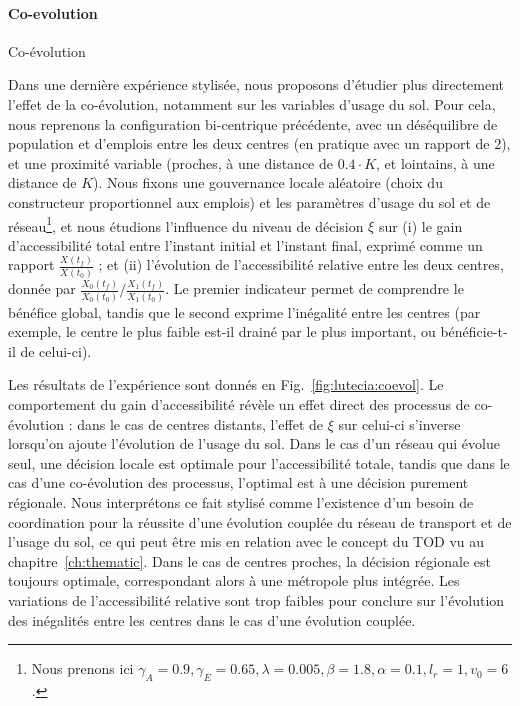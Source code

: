 \paragraph{Co-evolution}{Co-évolution}

Dans une dernière expérience stylisée, nous proposons d'étudier plus directement l'effet de la co-évolution, notamment sur les variables d'usage du sol. Pour cela, nous reprenons la configuration bi-centrique précédente, avec un déséquilibre de population et d'emplois entre les deux centres (en pratique avec un rapport de 2), et une proximité variable (proches, à une distance de $0.4\cdot K$, et lointains, à une distance de $K$). Nous fixons une gouvernance locale aléatoire (choix du constructeur proportionnel aux emplois) et les paramètres d'usage du sol et de réseau\footnote{Nous prenons ici $\gamma_A = 0.9, \gamma_E = 0.65, \lambda = 0.005, \beta = 1.8, \alpha = 0.1, l_r = 1, v_0 = 6$.}, et nous étudions l'influence du niveau de décision $\xi$ sur (i) le gain d'accessibilité total entre l'instant initial et l'instant final, exprimé comme un rapport $\frac{X(t_f)}{X(t_0)}$ ; et (ii) l'évolution de l'accessibilité relative entre les deux centres, donnée par $\frac{X_0(t_f)}{X_0(t_0)} / \frac{X_1(t_f)}{X_1(t_0)}$. Le premier indicateur permet de comprendre le bénéfice global, tandis que le second exprime l'inégalité entre les centres (par exemple, le centre le plus faible est-il drainé par le plus important, ou bénéficie-t-il de celui-ci).

Les résultats de l'expérience sont donnés en Fig.~\ref{fig:lutecia:coevol}. Le comportement du gain d'accessibilité révèle un effet direct des processus de co-évolution : dans le cas de centres distants, l'effet de $\xi$ sur celui-ci s'inverse lorsqu'on ajoute l'évolution de l'usage du sol. Dans le cas d'un réseau qui évolue seul, une décision locale est optimale pour l'accessibilité totale, tandis que dans le cas d'une co-évolution des processus, l'optimal est à une décision purement régionale. Nous interprétons ce fait stylisé comme l'existence d'un besoin de coordination pour la réussite d'une évolution couplée du réseau de transport et de l'usage du sol, ce qui peut être mis en relation avec le concept du TOD vu au chapitre~\ref{ch:thematic}. Dans le cas de centres proches, la décision régionale est toujours optimale, correspondant alors à une métropole plus intégrée. Les variations de l'accessibilité relative sont trop faibles pour conclure sur l'évolution des inégalités entre les centres dans le cas d'une évolution couplée.


